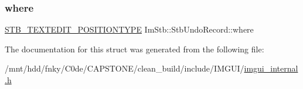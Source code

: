 \mbox{\label{structImStb_1_1StbUndoRecord_af2d8dd183ed445623c4c71e2ff8b4970}} 
\subsubsection{\texorpdfstring{where}{where}}
{\footnotesize\ttfamily \hyperlink{imstb__textedit_8h_a5d0c1b8751b6517e3d817f2a025ed654}{S\+T\+B\+\_\+\+T\+E\+X\+T\+E\+D\+I\+T\+\_\+\+P\+O\+S\+I\+T\+I\+O\+N\+T\+Y\+PE} Im\+Stb\+::\+Stb\+Undo\+Record\+::where}



The documentation for this struct was generated from the following file\+:\begin{DoxyCompactItemize}
\item 
/mnt/hdd/fnky/\+C0de/\+C\+A\+P\+S\+T\+O\+N\+E/clean\+\_\+build/include/\+I\+M\+G\+U\+I/\hyperlink{imgui__internal_8h}{imgui\+\_\+internal.\+h}\end{DoxyCompactItemize}
